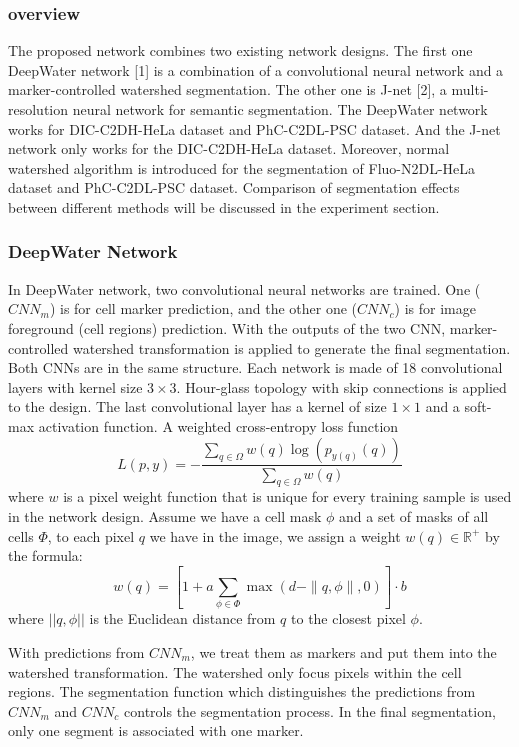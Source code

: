 \documentclass[conference]{IEEEtran}
\begin{document}
\subsubsection{overview}
The proposed network combines two existing network designs. The first one DeepWater network [1] is a combination of a convolutional neural network and a marker-controlled watershed segmentation. The other one is J-net [2], a multi-resolution neural network for semantic segmentation. The DeepWater network works for DIC-C2DH-HeLa dataset and PhC-C2DL-PSC dataset. And the J-net network only works for the DIC-C2DH-HeLa dataset.
Moreover, normal watershed algorithm is introduced for the segmentation of Fluo-N2DL-HeLa dataset and PhC-C2DL-PSC dataset. Comparison of segmentation effects between different methods will be discussed in the experiment section.
\subsubsection{DeepWater Network}
In DeepWater network, two convolutional neural networks are trained. One ($CNN_{m}$) is for cell marker prediction, and the other one ($CNN_{c}$) is for image foreground (cell regions) prediction. With the outputs of the two CNN, marker-controlled watershed transformation is applied to generate the final segmentation. Both CNNs are in the same structure. Each network is made of 18 convolutional layers with kernel size $3\times 3$. Hour-glass topology with skip connections is applied to the design. The last convolutional layer has a kernel of size $1\times 1$ and a soft-max activation function. A weighted cross-entropy loss function
\begin{equation}
L(p, y)=-\frac{\sum_{q \in \Omega} w(q) \log \left(p_{y(q)}(q)\right)}{\sum_{q \in \Omega} w(q)}\label{eq1}
\end{equation}
where $w$ is a pixel weight function that is unique for every training sample is used in the network design. Assume we have a cell mask $\phi$ and a set of masks of all cells $\Phi$, to each pixel $q$ we have in the image, we assign a weight $w(q)\in \mathbb{R}^{+} $ by the formula:
\begin{equation}
w(q)=\left[1+a \sum_{\phi \in \Phi} \max (d-\|q, \phi\|, 0)\right] \cdot b\label{eq2}
\end{equation}
where $||q,\phi ||$ is the Euclidean distance from $q$ to the closest pixel $\phi$.\par 
With predictions from $CNN_{m}$, we treat them as markers and put them into the watershed transformation. The watershed only focus pixels within the cell regions. The segmentation function which distinguishes the predictions from $CNN_{m}$ and $CNN_{c}$ controls the segmentation process. In the final segmentation, only one segment is associated with one marker.
\end{document}
